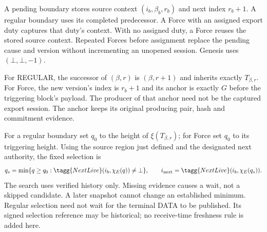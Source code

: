 A pending boundary stores source context
$(i_b,\beta_b,r_b)$ and next index $r_b+1$. A regular boundary uses
its completed predecessor. A Force with an assigned export duty
captures that duty's context. With no assigned duty, a Force reuses
the stored source context. Repeated Forces before assignment replace
the pending cause and version without incrementing an unopened
session. Genesis uses $(\bot,\bot,-1)$.

For REGULAR, the successor of $(\beta,r)$ is $(\beta,r+1)$ and
inherits exactly $T_{\beta,r}$. For Force, the new version's index is
$r_b+1$ and its anchor is exactly $G$ before the triggering block's
payload. The producer of that anchor need not be the captured export
session. The anchor keeps its original producing pair, hash and
commitment evidence.

For a regular boundary set $q_0$ to the height of
$\xi(T_{\beta,r})$; for Force set $q_0$ to its triggering height.
Using the source region just defined and the designated next authority,
the fixed selection is
\[
 q_s=\min\{q\ge q_0:
 \tagg{NextLive}(i_b,\chi_E(q))\ne\bot\},\qquad
 i_{\rm next}=\tagg{NextLive}(i_b,\chi_E(q_s)).
\]
The search uses verified history only. Missing evidence causes a wait,
not a skipped candidate. A later snapshot cannot change an established
minimum. Regular selection need not wait for the terminal DATA to be
published. Its signed selection reference may be historical; no
receive-time freshness rule is added here.


